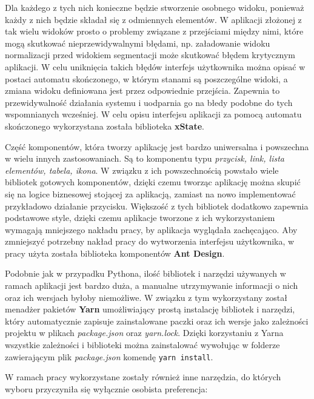 \documentclass[10pt,polish,a4paper,oneside]{ppfcmthesis}
\begin{document}
Dla każdego z tych nich konieczne będzie stworzenie osobnego widoku, ponieważ każdy z nich będzie składał
się z odmiennych elementów. W aplikacji złożonej z tak wielu widoków prosto o problemy związane z przejściami między nimi,
które mogą skutkowa\'c nieprzewidywalnymi błędami, np. załadowanie widoku normalizacji przed widokiem segmentacji
może skutkowa\'c błędem krytycznym aplikacji. W celu uniknięcia takich błędów interfejs użytkownika można
opisa\'c w postaci automatu skończonego, w którym stanami są poszczególne widoki, a zmiana widoku definiowana
jest przez odpowiednie przejścia. Zapewnia to przewidywalnoś\'c działania systemu i uodparnia go na
błedy podobne do tych wspomnianych wcześniej. W celu opisu interfejsu aplikacji za pomocą automatu skończonego
wykorzystana została biblioteka \textbf{xState}.\newline

Częś\'c komponentów, która tworzy aplikację jest bardzo uniwersalna i powszechna w wielu innych zastosowaniach.
Są to komponentu typu \textit{przycisk, link, lista elementów, tabela, ikona}. W związku z ich powszechnością
powstało wiele bibliotek gotowych komponentów, dzięki czemu tworząc aplikację można skupi\'c się na logice
biznesowej stojącej za aplikacją, zamiast na nowo implementowa\'c przykładowo działanie przycisku. Większoś\'c
z tych bibliotek dodatkowo zapewnia podstawowe style, dzięki czemu aplikacje tworzone z ich wykorzystaniem
wymagają mniejszego nakładu pracy, by aplikacja wyglądała zachęcająco. Aby zmniejszy\'c potrzebny nakład
pracy do wytworzenia interfejsu użytkownika, w pracy użyta została biblioteka komponentów \textbf{Ant Design}.
\newline

Podobnie jak w przypadku Pythona, iloś\'c bibliotek i narzędzi używanych w ramach aplikacji jest bardzo duża,
a manualne utrzymywanie informacji o nich oraz ich wersjach byłoby niemożliwe. W związku z tym wykorzystany
został menadżer pakietów \textbf{Yarn} umożliwiający prostą instalację bibliotek i narzędzi, który automatycznie
zapisuje zainstalowane paczki oraz ich wersje jako zależności projektu w plikach \textit{package.json} oraz
\textit{yarn.lock}. Dzięki korzystaniu z Yarna wszystkie zależności i biblioteki można zainstalowa\'c wywołując
w folderze zawierającym plik \textit{package.json} komendę \texttt{yarn install}.\newline

\noindent
W ramach pracy wykorzystane zostały również inne narzędzia, do których wyboru przyczyniła się wyłącznie
osobista preferencja:
\end{document}
